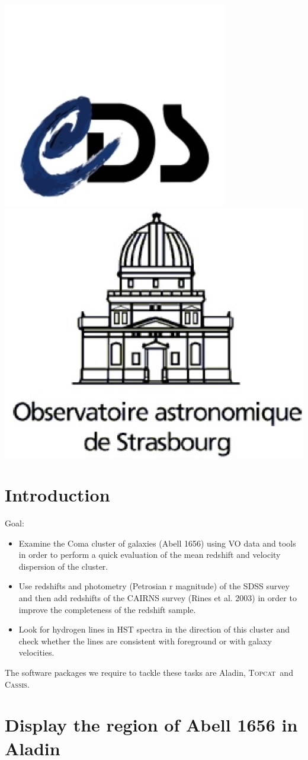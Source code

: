 \documentclass [a4paper, 12pt]{article}
\newcommand{\aladin}{{\textsc{A}{ladin}}}
\newcommand{\topcat}{{\textsc{Topcat}}}
\newcommand{\cassis}{{\textsc{Cassis}}}
\begin{document}
\vspace{0.5cm}
\begin{center} \includegraphics[width=0.13 
\textwidth]{../images/logo_cdsv2.jpg}  \hspace{10cm} 
\includegraphics[width=0.18 
\textwidth]{../images/logo_observatoire.jpg}\end{center}


\newpage
\normalsize
\vfill
\tableofcontents
\vfill

\newpage

\justify
\section{Introduction}

Goal: 
\begin{itemize}
\item  Examine the Coma cluster of galaxies (Abell 1656) using VO data and tools in order to perform a quick evaluation of the mean redshift and velocity dispersion of the cluster. 
\item Use redshifts and photometry (Petrosian r magnitude) of the SDSS survey and then add redshifts of the CAIRNS survey (Rines et al. 2003) in order to improve the completeness of the redshift sample. 
\item Look for hydrogen lines in HST spectra in the direction of this cluster and check whether the lines are consistent with foreground or with galaxy velocities.\\
\end{itemize}
\noindent The software packages we require to tackle these tasks are \aladin, 
\topcat\ and \cassis.

\section{Display the region of Abell 1656 in \aladin}
\end{document}
